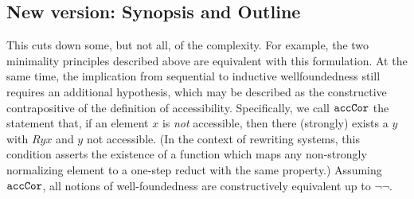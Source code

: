 %
%
%
%
\subsection{New version: Synopsis and Outline} 
This cuts down some, but not all, of the complexity.
For example, the two minimality principles
described above are equivalent with this formulation.
At the same time, the
implication from sequential to inductive wellfoundedness
still requires an additional hypothesis, which may be described as the
constructive contrapositive of the definition of accessibility.
Specifically, we call {$\mathtt{accCor}$} the statement that, if an element $x$
is \emph{not} accessible, then there (strongly) exists a $y$ with $Ryx$
and $y$ not accessible.  (In the context of rewriting systems,
this condition asserts the existence of a function which maps any
non-strongly normalizing element to a one-step reduct with the same property.)
Assuming $\mathtt{accCor}$, all notions of well-foundedness
are constructively equivalent up to $\lnot\lnot$.

